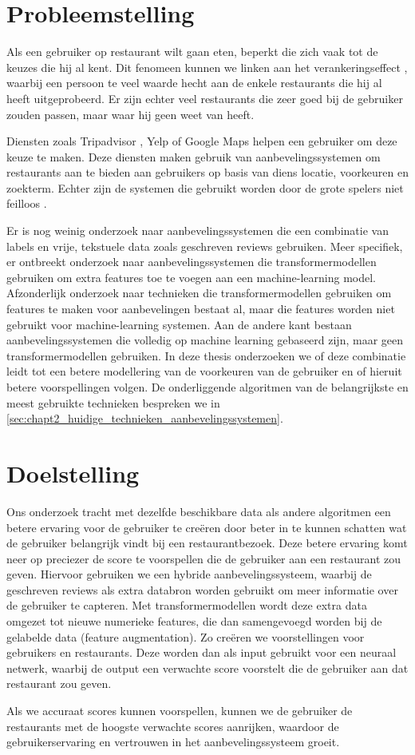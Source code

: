 
\section{Probleemstelling}
Als een gebruiker op restaurant wilt gaan eten, beperkt die zich vaak tot de keuzes die hij al kent. Dit fenomeen kunnen we linken aan het verankeringseffect \cite{anchoring_effect}, waarbij een persoon te veel waarde hecht aan de enkele restaurants die hij al heeft uitgeprobeerd. Er zijn echter veel restaurants die zeer goed bij de gebruiker zouden passen, maar waar hij geen weet van heeft.

Diensten zoals Tripadvisor \cite{tripadvisor_algorithm}, Yelp of Google Maps helpen een gebruiker om deze keuze te maken. Deze diensten maken gebruik van aanbevelingssystemen om restaurants aan te bieden aan gebruikers op basis van diens locatie, voorkeuren en zoekterm. Echter zijn de systemen die gebruikt worden door de grote spelers niet feilloos \cite{recsys_bad, recsys_youtube_bad}. 

Er is nog weinig onderzoek naar aanbevelingssystemen die een combinatie van labels en vrije, tekstuele data zoals geschreven reviews gebruiken. Meer specifiek, er ontbreekt onderzoek naar aanbevelingssystemen die transformermodellen gebruiken om extra features toe te voegen aan een machine-learning model. Afzonderlijk onderzoek naar technieken die transformermodellen gebruiken om features te maken voor aanbevelingen bestaat al, maar die features worden niet gebruikt voor machine-learning systemen. \cite{masterthesis_nlp_italie} Aan de andere kant bestaan aanbevelingssystemen die volledig op machine learning gebaseerd zijn, maar geen transformermodellen gebruiken. \cite{deepconn} In deze thesis onderzoeken we of deze combinatie leidt tot een betere modellering van de voorkeuren van de gebruiker en of hieruit betere voorspellingen volgen. De onderliggende algoritmen van de belangrijkste en meest gebruikte technieken bespreken we in \autoref{sec:chapt2_huidige_technieken_aanbevelingssystemen}. 


\section{Doelstelling}
Ons onderzoek tracht met dezelfde beschikbare data als andere algoritmen een betere ervaring voor de gebruiker te creëren door beter in te kunnen schatten wat de gebruiker belangrijk vindt bij een restaurantbezoek. Deze betere ervaring komt neer op preciezer de score te voorspellen die de gebruiker aan een restaurant zou geven. Hiervoor gebruiken we een hybride aanbevelingssysteem, waarbij de geschreven reviews als extra databron worden gebruikt om meer informatie over de gebruiker te capteren. Met transformermodellen wordt deze extra data omgezet tot nieuwe numerieke features, die dan samengevoegd worden bij de gelabelde data (feature augmentation). Zo creëren we voorstellingen voor gebruikers en restaurants. Deze worden dan als input gebruikt voor een neuraal netwerk, waarbij de output een verwachte score voorstelt die de gebruiker aan dat restaurant zou geven.


Als we accuraat scores kunnen voorspellen, kunnen we de gebruiker de restaurants met de hoogste verwachte scores aanrijken, waardoor de gebruikerservaring en vertrouwen in het aanbevelingssysteem groeit.
